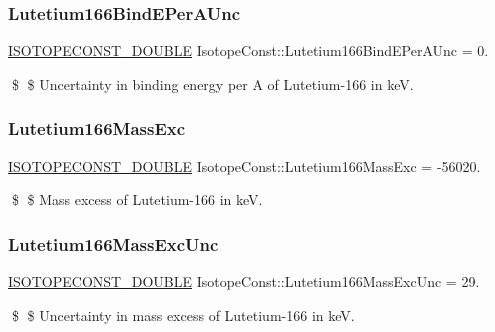 \subsubsection{\texorpdfstring{Lutetium166\+Bind\+E\+Per\+A\+Unc}{Lutetium166BindEPerAUnc}}
{\footnotesize\ttfamily \mbox{\hyperlink{group___isotope_const-_macros_ga8f45a7272ce02c0b4c65c44636ed719a}{I\+S\+O\+T\+O\+P\+E\+C\+O\+N\+S\+T\+\_\+\+D\+O\+U\+B\+LE}} Isotope\+Const\+::\+Lutetium166\+Bind\+E\+Per\+A\+Unc = 0.}

\$ \$ Uncertainty in binding energy per A of Lutetium-\/166 in keV. \mbox{\label{group___isotope_const-_lutetium-_lu166_ga8b04c4e55316cb45ba21967b0e59f968}} 
\subsubsection{\texorpdfstring{Lutetium166\+Mass\+Exc}{Lutetium166MassExc}}
{\footnotesize\ttfamily \mbox{\hyperlink{group___isotope_const-_macros_ga8f45a7272ce02c0b4c65c44636ed719a}{I\+S\+O\+T\+O\+P\+E\+C\+O\+N\+S\+T\+\_\+\+D\+O\+U\+B\+LE}} Isotope\+Const\+::\+Lutetium166\+Mass\+Exc = -\/56020.}

\$ \$ Mass excess of Lutetium-\/166 in keV. \mbox{\label{group___isotope_const-_lutetium-_lu166_ga16f140a11af557b028bfa5fb572636a1}} 
\subsubsection{\texorpdfstring{Lutetium166\+Mass\+Exc\+Unc}{Lutetium166MassExcUnc}}
{\footnotesize\ttfamily \mbox{\hyperlink{group___isotope_const-_macros_ga8f45a7272ce02c0b4c65c44636ed719a}{I\+S\+O\+T\+O\+P\+E\+C\+O\+N\+S\+T\+\_\+\+D\+O\+U\+B\+LE}} Isotope\+Const\+::\+Lutetium166\+Mass\+Exc\+Unc = 29.}

\$ \$ Uncertainty in mass excess of Lutetium-\/166 in keV. \mbox{\label{group___isotope_const-_lutetium-_lu166_ga58bca3b61f28da4ec5899ff4fd4d68ef}} 
